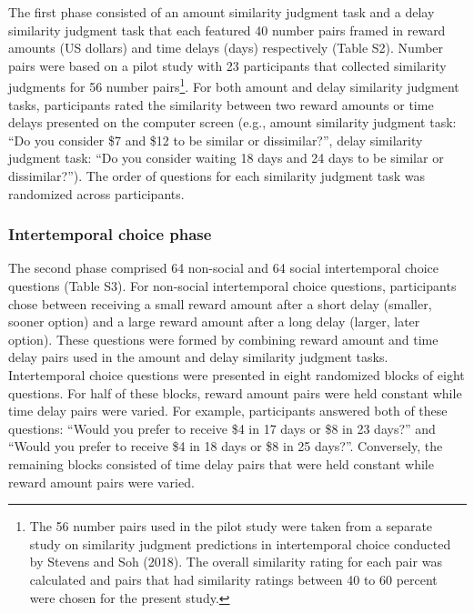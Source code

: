 \documentclass[
  pub,floatsintext]{apa6}
\begin{document}
The first phase consisted of an amount similarity judgment task and a delay similarity judgment task that each featured 40 number pairs framed in reward amounts (US dollars) and time delays (days) respectively (Table S2). Number pairs were based on a pilot study with 23 participants that collected similarity judgments for 56 number pairs\footnote{The 56 number pairs used in the pilot study were taken from a separate study on similarity judgment predictions in intertemporal choice conducted by Stevens and Soh (2018). The overall similarity rating for each pair was calculated and pairs that had similarity ratings between 40 to 60 percent were chosen for the present study.}. For both amount and delay similarity judgment tasks, participants rated the similarity between two reward amounts or time delays presented on the computer screen (e.g., amount similarity judgment task: ``Do you consider \$7 and \$12 to be similar or dissimilar?'', delay similarity judgment task: ``Do you consider waiting 18 days and 24 days to be similar or dissimilar?''). The order of questions for each similarity judgment task was randomized across participants.

\hypertarget{intertemporal-choice-phase}{%
\subsubsection{Intertemporal choice phase}\label{intertemporal-choice-phase}}

The second phase comprised 64 non-social and 64 social intertemporal choice questions (Table S3). For non-social intertemporal choice questions, participants chose between receiving a small reward amount after a short delay (smaller, sooner option) and a large reward amount after a long delay (larger, later option). These questions were formed by combining reward amount and time delay pairs used in the amount and delay similarity judgment tasks. Intertemporal choice questions were presented in eight randomized blocks of eight questions. For half of these blocks, reward amount pairs were held constant while time delay pairs were varied. For example, participants answered both of these questions: ``Would you prefer to receive \$4 in 17 days or \$8 in 23 days?'' and ``Would you prefer to receive \$4 in 18 days or \$8 in 25 days?''. Conversely, the remaining blocks consisted of time delay pairs that were held constant while reward amount pairs were varied.
\end{document}
